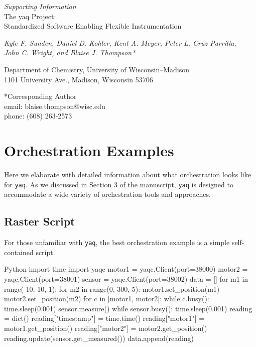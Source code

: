 \documentclass[11pt, full]{article}
\newcommand\yaq{\texttt{yaq}}
\renewcommand{\thefigure}{S\arabic{figure}}
\let\stdsection\section
\renewcommand\section{\clearpage\stdsection}
\begin{document}

\begin{center}
  \LARGE

  \textit{Supporting Information} \\
  The yaq Project: \\
  Standardized Software Enabling Flexible Instrumentation

  \normalsize

  \textit{Kyle F. Sunden, Daniel D. Kohler, Kent A. Meyer, Peter L. Cruz Parrilla, \\
    John C. Wright, and Blaise J. Thompson*}

  Department of Chemistry, University of Wisconsin--Madison\\
  1101 University Ave., Madison, Wisconsin 53706
\end{center}

\vspace{\fill}

*Corresponding Author \\
\hspace*{2ex} email: blaise.thompson@wisc.edu \\
\hspace*{2ex} phone: (608) 263-2573

\pagebreak
\setcounter{page}{1}
\renewcommand{\thepage}{S\arabic{page}}
\renewcommand{\thefigure}{S\arabic{figure}}

\pagebreak
\renewcommand{\baselinestretch}{0.75}\normalsize
\tableofcontents
\renewcommand{\baselinestretch}{1.0}\normalsize

\section{Orchestration Examples}

Here we elaborate with detailed information about what orchestration looks like for \yaq{}.
As we discussed in Section 3 of the manuscript, \yaq{} is designed to accommodate a wide variety of orchestration tools and approaches.

\subsection{Raster Script}

For those unfamiliar with \yaq{}, the best orchestration example is a simple self-contained script.

\begin{codefragment}{Python}
import time
import yaqc
motor1 = yaqc.Client(port=38000)
motor2 = yaqc.Client(port=38001)
sensor = yaqc.Client(port=38002)
data = []
for m1 in range(-10, 10, 1):
    for m2 in range(0, 300, 5):
        motor1.set_position(m1)
        motor2.set_position(m2)
        for c in [motor1, motor2]:
            while c.busy():
                time.sleep(0.001)
        sensor.measure()
        while sensor.busy():
            time.sleep(0.001)
        reading = dict()
        reading["timestamp"] = time.time()
        reading["motor1"] = motor1.get_position()
        reading["motor2"] = motor2.get_position()
        reading.update(sensor.get_measured())
        data.append(reading)
\end{codefragment}
\end{document}
